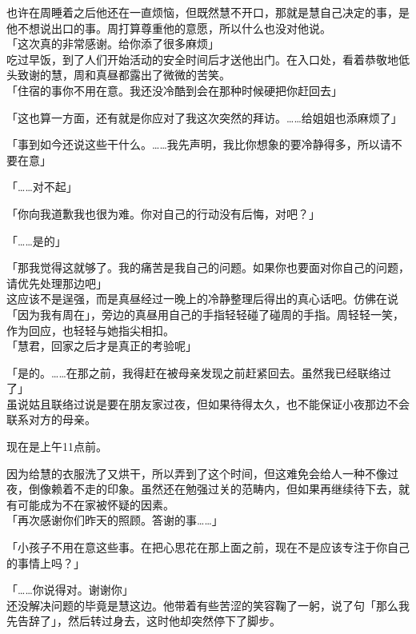 也许在周睡着之后他还在一直烦恼，但既然慧不开口，那就是慧自己决定的事，是他不想说出口的事。周打算尊重他的意愿，所以什么也没对他说。\\

「这次真的非常感谢。给你添了很多麻烦」\\

吃过早饭，到了人们开始活动的安全时间后才送他出门。在入口处，看着恭敬地低头致谢的慧，周和真昼都露出了微微的苦笑。\\

「住宿的事你不用在意。我还没冷酷到会在那种时候硬把你赶回去」

「这也算一方面，还有就是你应对了我这次突然的拜访。……给姐姐也添麻烦了」

「事到如今还说这些干什么。……我先声明，我比你想象的要冷静得多，所以请不要在意」

「……对不起」

「你向我道歉我也很为难。你对自己的行动没有后悔，对吧？」

「……是的」

「那我觉得这就够了。我的痛苦是我自己的问题。如果你也要面对你自己的问题，请优先处理那边吧」\\

这应该不是逞强，而是真昼经过一晚上的冷静整理后得出的真心话吧。仿佛在说「因为我有周在」，旁边的真昼用自己的手指轻轻碰了碰周的手指。周轻轻一笑，作为回应，也轻轻与她指尖相扣。\\

「慧君，回家之后才是真正的考验呢」

「是的。……在那之前，我得赶在被母亲发现之前赶紧回去。虽然我已经联络过了」\\

虽说姑且联络过说是要在朋友家过夜，但如果待得太久，也不能保证小夜那边不会联系对方的母亲。

现在是上午11点前。

因为给慧的衣服洗了又烘干，所以弄到了这个时间，但这难免会给人一种不像过夜，倒像赖着不走的印象。虽然还在勉强过关的范畴内，但如果再继续待下去，就有可能成为不在家被怀疑的因素。\\

「再次感谢你们昨天的照顾。答谢的事……」

「小孩子不用在意这些事。在把心思花在那上面之前，现在不是应该专注于你自己的事情上吗？」

「……你说得对。谢谢你」\\

还没解决问题的毕竟是慧这边。他带着有些苦涩的笑容鞠了一躬，说了句「那么我先告辞了」，然后转过身去，这时他却突然停下了脚步。\\

